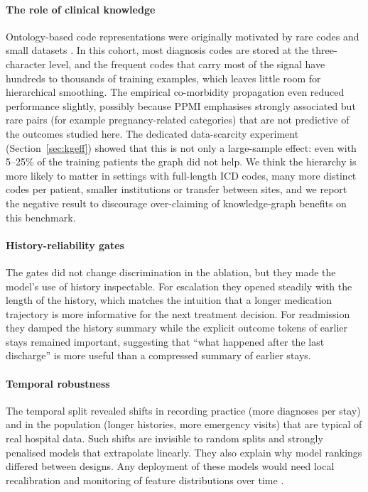 \paragraph{The role of clinical knowledge}
Ontology-based code representations were originally motivated by rare codes
and small datasets \citep{choi2017gram}. In this cohort, most diagnosis
codes are stored at the three-character level, and the frequent codes that
carry most of the signal have hundreds to thousands of training examples,
which leaves little room for hierarchical smoothing. The empirical
co-morbidity propagation even reduced performance slightly, possibly because
PPMI emphasises strongly associated but rare pairs (for example
pregnancy-related categories) that are not predictive of the outcomes
studied here. The dedicated data-scarcity experiment
(Section~\ref{sec:kgeff}) showed that this is not only a large-sample
effect: even with 5--25\% of the training patients the graph did not help.
We think the hierarchy is more likely to matter in settings with
full-length ICD codes, many more distinct codes per patient, smaller
institutions or transfer between sites, and we report the negative result
to discourage over-claiming of knowledge-graph benefits on this
benchmark.

\paragraph{History-reliability gates}
The gates did not change discrimination in the ablation, but they made the
model's use of history inspectable. For escalation they opened steadily with
the length of the history, which matches the intuition that a longer
medication trajectory is more informative for the next treatment decision.
For readmission they damped the history summary while the explicit outcome
tokens of earlier stays remained important, suggesting that ``what happened
after the last discharge'' is more useful than a compressed summary of
earlier stays.

\paragraph{Temporal robustness}
The temporal split revealed shifts in recording practice (more diagnoses per
stay) and in the population (longer histories, more emergency visits) that
are typical of real hospital data. Such shifts are invisible to random
splits and strongly penalised models that extrapolate linearly. They also
explain why model rankings differed between designs. Any deployment of
these models would need local recalibration and monitoring of feature
distributions over time \citep{vancalster2019}.

